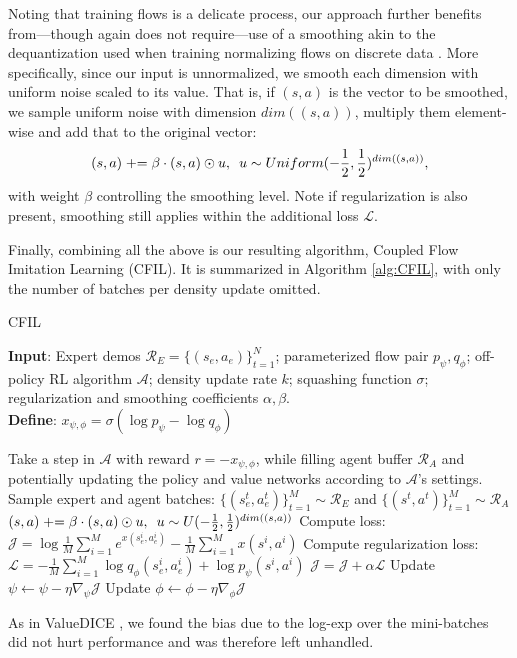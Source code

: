 Noting that training flows is a delicate process, our approach further benefits from—though again does not require—use of a smoothing akin to the dequantization used when training normalizing flows on discrete data \cite{papamakarios2017masked}. More specifically, since our input is unnormalized, we smooth each dimension with uniform noise scaled to its value. That is, if $(s,a)$ is the vector to be smoothed, we sample uniform noise with dimension $dim((s,a))$, multiply them element-wise and add that to the original vector:
\begin{equation}
    {(s,a) \mathrel{{+}{=}} \beta \cdot (s,a) \odot u, \hspace{0.5em} u \sim Uniform(-\frac{1}{2},\frac{1}{2})^{dim((s,a))}},
\end{equation}
with weight $\beta$ controlling the smoothing level. Note if regularization is also present, smoothing still applies within the additional loss $\mathcal{L}$.


Finally, combining  all the above is our resulting algorithm, Coupled Flow Imitation Learning (CFIL). It is summarized in Algorithm \ref{alg:CFIL}, with only the number of batches per density update omitted. 
%
\begin{algorithm}[tb]
\caption{CFIL}
\label{alg:CFIL}
\textbf{Input}: Expert demos $\mathcal{R}_E = \{(s_e,a_e)\}_{t=1}^N$; parameterized flow pair $p_\psi,q_\phi$; off-policy RL algorithm $\mathcal{A}$; density update rate $k$; squashing function $\sigma$; regularization and smoothing coefficients $\alpha, \beta$.\\
\textbf{Define}: $x_{\psi,\phi} = \sigma(\log p_\psi - \log q_\phi)$
\begin{algorithmic}[1] %
\STATE Take a step in $\mathcal{A}$ with reward $r=-x_{\psi,\phi}$, while filling agent buffer $\mathcal{R}_A$ and potentially updating the policy and value networks according to $\mathcal{A}$'s settings.
\STATE Sample expert and agent batches:
\STATE $\{(s_e^t,a_e^t)\}_{t=1}^M \sim \mathcal{R}_E$ and  $\{(s^t,a^t)\}_{t=1}^M \sim \mathcal{R}_A$
\STATE ${(s,a) \mathrel{{+}{=}} \beta \cdot (s,a) \odot u, \hspace{0.5em} u \sim U(-\frac{1}{2},\frac{1}{2})^{dim((s,a))}}$ 
\ENDIF
\STATE Compute loss: %
\STATE $\mathcal{J} = \log \frac{1}{M} \sum_{i=1}^M e^{x(s_e^i,a_e^i)} - \frac{1}{M} \sum_{i=1}^M x(s^i,a^i)$
\STATE Compute regularization loss:
\STATE $\mathcal{L} = - \frac{1}{M} \sum_{i=1}^M \log  q_\phi(s_e^i,a_e^i) + \log  p_\psi(s^i,a^i)$
\STATE $\mathcal{J} = \mathcal{J} + \alpha \mathcal{L}$
\ENDIF
\STATE Update $\psi \leftarrow \psi - \eta \nabla_{\psi}\mathcal{J}$
\STATE Update $\phi \leftarrow \phi - \eta \nabla_{\phi}\mathcal{J}$
\ENDIF
\ENDFOR


\end{algorithmic}
\end{algorithm}
As in ValueDICE \cite{kostrikov2019imitation}, we found the bias due to the log-exp over the mini-batches did not hurt performance and was therefore left unhandled.

